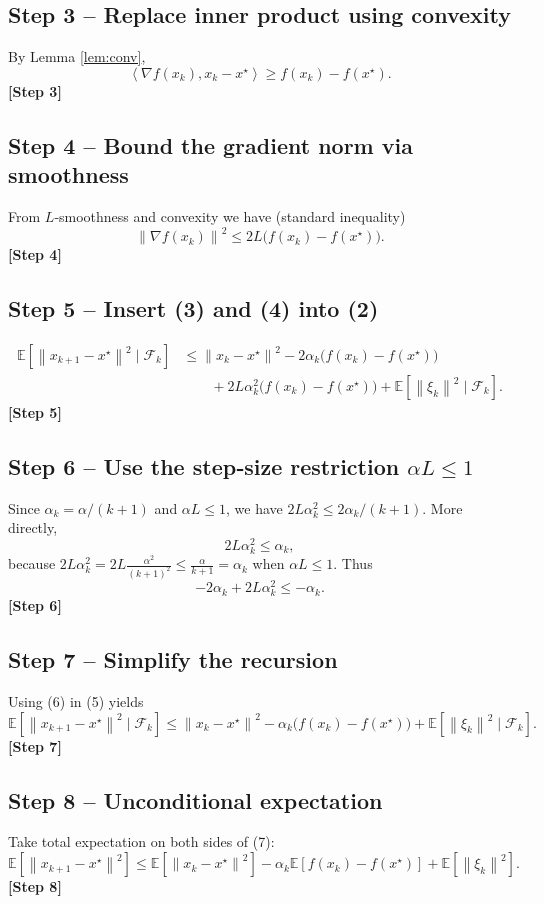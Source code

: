\documentclass{article}
\newcommand{\E}{\mathbb{E}}
\newcommand{\norm}[1]{\left\lVert #1\right\rVert}
\newcommand{\ip}[2]{\left\langle #1,#2\right\rangle}
\begin{document}
\subsection*{Step 3 – Replace inner product using convexity}
By Lemma \ref{lem:conv},
\[
\ip{\nabla f(x_k)}{x_k-x^\star}\ge f(x_k)-f(x^\star).
\tag{3}
\]
\textbf{[Step 3]}

\subsection*{Step 4 – Bound the gradient norm via smoothness}
From $L$‑smoothness and convexity we have (standard inequality)
\[
\norm{\nabla f(x_k)}^{2}\le 2L\bigl(f(x_k)-f(x^\star)\bigr). \tag{4}
\]
\textbf{[Step 4]}

\subsection*{Step 5 – Insert (3) and (4) into (2)}
\[
\begin{aligned}
\E\!\left[\norm{x_{k+1}-x^\star}^{2}\mid\mathcal F_k\right]
&\le \norm{x_k-x^\star}^{2}
-2\alpha_k\bigl(f(x_k)-f(x^\star)\bigr)\\
&\qquad+2L\alpha_k^{2}\bigl(f(x_k)-f(x^\star)\bigr)
+\E\!\left[\norm{\xi_k}^{2}\mid\mathcal F_k\right].
\end{aligned}
\tag{5}
\]
\textbf{[Step 5]}

\subsection*{Step 6 – Use the step‑size restriction $\alpha L\le 1$}
Since $\alpha_k=\alpha/(k+1)$ and $\alpha L\le 1$, we have $2L\alpha_k^{2}\le 2\alpha_k/(k+1)$. More directly,
\[
2L\alpha_k^{2}\le \alpha_k,
\]
because $2L\alpha_k^{2}=2L\frac{\alpha^{2}}{(k+1)^{2}}\le\frac{\alpha}{k+1}=\alpha_k$ when $\alpha L\le 1$.
Thus
\[
-2\alpha_k+2L\alpha_k^{2}\le -\alpha_k .
\tag{6}
\]
\textbf{[Step 6]}

\subsection*{Step 7 – Simplify the recursion}
Using (6) in (5) yields
\[
\E\!\left[\norm{x_{k+1}-x^\star}^{2}\mid\mathcal F_k\right]
\le \norm{x_k-x^\star}^{2}
-\alpha_k\bigl(f(x_k)-f(x^\star)\bigr)
+\E\!\left[\norm{\xi_k}^{2}\mid\mathcal F_k\right].
\tag{7}
\]
\textbf{[Step 7]}

\subsection*{Step 8 – Unconditional expectation}
Take total expectation on both sides of (7):
\[
\E\!\left[\norm{x_{k+1}-x^\star}^{2}\right]
\le \E\!\left[\norm{x_k-x^\star}^{2}\right]
-\alpha_k\E\!\left[f(x_k)-f(x^\star)\right]
+\E\!\left[\norm{\xi_k}^{2}\right].
\tag{8}
\]
\textbf{[Step 8]}
\end{document}
